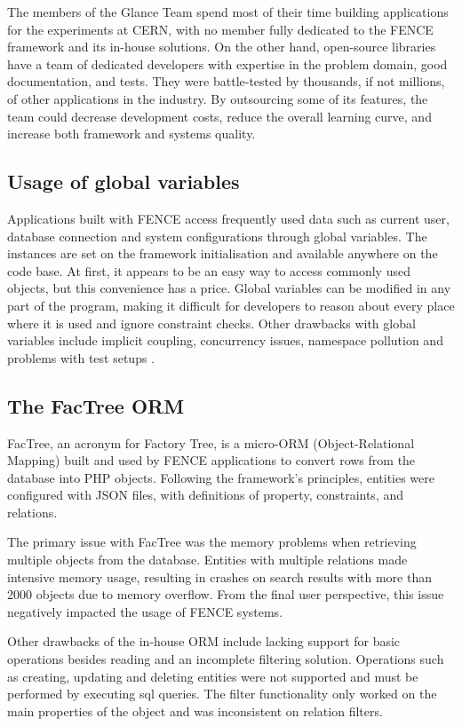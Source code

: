 The members of the Glance Team spend most of their time building applications for the experiments at CERN, with no member fully dedicated to the FENCE framework and its in-house solutions. On the other hand, open-source libraries have a team of dedicated developers with expertise in the problem domain, good documentation, and tests. They were battle-tested by thousands, if not millions, of other applications in the industry. By outsourcing some of its features, the team could decrease development costs, reduce the overall learning curve, and increase both framework and systems quality.

\subsection{Usage of global variables}
\label{sec:global-variables}

Applications built with FENCE access frequently used data such as current user, database connection and system configurations through global variables. The instances are set on the framework initialisation and available anywhere on the code base. At first, it appears to be an easy way to access commonly used objects, but this convenience has a price. Global variables can be modified in any part of the program, making it difficult for developers to reason about every place where it is used and ignore constraint checks. Other drawbacks with global variables include implicit coupling, concurrency issues, namespace pollution and problems with test setups \cite{rishikesh}.

\subsection{The FacTree ORM}

FacTree, an acronym for Factory Tree, is a micro-ORM (Object-Relational Mapping) built and used by FENCE applications to convert rows from the database into PHP objects. Following the framework's principles, entities were configured with JSON files, with definitions of property, constraints, and relations.

The primary issue with FacTree was the memory problems when retrieving multiple objects from the database. Entities with multiple relations made intensive memory usage, resulting in crashes on search results with more than 2000 objects due to memory overflow. From the final user perspective, this issue negatively impacted the usage of FENCE systems.

Other drawbacks of the in-house ORM include lacking support for basic operations besides reading and an incomplete filtering solution. Operations such as creating, updating and deleting entities were not supported and must be performed by executing \acrshort{sql} queries. The filter functionality only worked on the main properties of the object and was inconsistent on relation filters.

